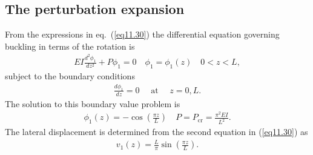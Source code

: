 \documentclass{AeroStructure-ERJohnson}
\begin{document}
\subsection{The perturbation expansion}\label{sec11.2.2}

From the expressions in eq.~(\ref{eq11.30}) the differential equation governing buckling in terms of the rotation is
\begin{align}
E I \frac{d^{2} \phi_{1}}{d z^{2}}+P \phi_{1}=0 \quad \phi_{1}=\phi_{1}(z) \quad 0<z<L, \label{eq11.36}
\end{align}
subject to the boundary conditions
\begin{align}
\frac{d \phi_{1}}{d z}=0 \quad \text { at } \quad z=0, L. \label{eq11.37}
\end{align}
The solution to this boundary value problem is
\begin{align}
\phi_{1}(z)=-\cos \left(\frac{\pi z}{L}\right) \quad P=P_{\textrm{cr}}=\frac{\pi^{2} E I}{L^{2}}. \label{eq11.38}
\end{align}
The lateral displacement is determined from the second equation in (\ref{eq11.30}) as
\begin{align}\label{eq11.39}
 v_{1}(z)=\frac{L}{\pi} \sin \left(\frac{\pi z}{L}\right).
\end{align}
\end{document}
